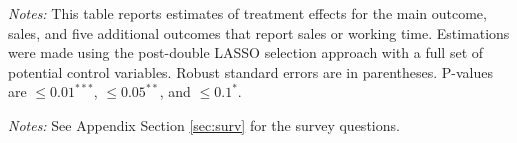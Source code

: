 \documentclass[12pt]{article}
\begin{document}
\begin{table}[H]
\centering
\begin{threeparttable}
\caption{\label{tab:waitlist} Results for the waitlist control, with originally treated serving as controls}
\normalsize


\vspace{0.5em} %

\begin{tablenotes}[flushleft]
\small
\item \textit{Notes:} This table reports estimates of treatment effects for the main outcome, sales, and five additional outcomes that report sales or working time. Estimations were made using the post-double LASSO selection approach with a full set of potential control variables. Robust standard errors are in parentheses. P-values are $\leq 0.01^{***}$, $\leq 0.05^{**}$, and $\leq 0.1^{*}$.
\end{tablenotes}
\end{threeparttable}
\end{table}
\clearpage


\begin{table} [H]
\centering
\begin{threeparttable} 
\small
\caption{\label{tab:surveysummary} Descriptive statistics from survey}
\small{}
\begin{tablenotes}
\small
\textit{Notes:} See Appendix Section \ref{sec:surv}  for the survey questions. 
\end{tablenotes}
\end{threeparttable}
\end{table}
\clearpage








\end{document}
